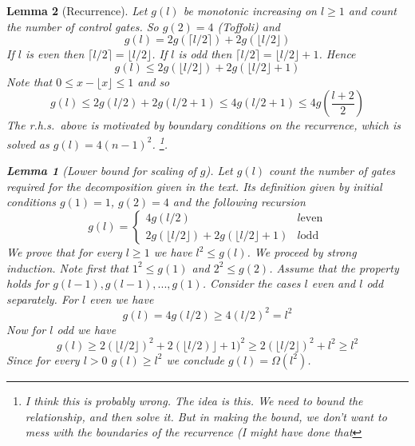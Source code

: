\documentclass[12pt]{article}
\newcommand{\1}[1]{\mathds{1}\left[#1\right]}
\newtheorem{lemma}{Lemma}
\begin{document}
\begin{lemma}[Recurrence]
Let $g(l)$ be monotonic increasing on $l\geq 1$ and count the number of control gates.  So $g(2)=4$ (Toffoli) and 
\begin{equation}
    g(l) = 2 g(\lceil l/2 \rceil) + 2 g(\lfloor l/2 \rfloor)
\end{equation}
If $l$ is even then $\lceil l/2 \rceil = \lfloor l/2 \rfloor$.  If $l$ is odd then $\lceil l/2 \rceil = \lfloor l/2 \rfloor + 1$.  Hence 
\begin{equation}
    g(l) \leq 2 g(\lfloor l/2 \rfloor) + 2g(\lfloor l/2 \rfloor + 1)
\end{equation}
Note that $0 \leq x-\lfloor x \rfloor\leq 1$ and so 
\begin{equation}
    g(l) \leq 2 g(l/2) + 2g(l/2 + 1)\leq 4 g(l/2 + 1)\leq  4 g\left(\frac{l+2}{2}\right)
\end{equation}
The r.h.s.~above is motivated by boundary conditions on the recurrence, which is solved as $g(l)=4(n-1)^2$. \footnote{I think this is probably wrong.  The idea is this.  We need to bound the relationship, and then solve it.  But in making the bound, we don't want to mess with the boundaries of the recurrence (I might have done that}.  

\begin{lemma}[Lower bound for scaling of $g$]
Let $g(l)$ count the number of gates required for the decomposition given in the text. Its definition given by initial conditions $g(1)=1$, $g(2)=4$ and the following recursion
$$g(l)=\begin{cases}4g(l/2)&l \text{even}\\ 2g(\lfloor l/2 \rfloor) + 2g(\lfloor l/2 \rfloor +1)&l \text{odd}\end{cases}$$
We prove that for every  $l \geq 1$ we have  $l^2 \leq g(l)$. We proceed by strong induction. Note first that $1^2 \leq g(1)$ and $2^2 \leq g(2)$. Assume that the property holds for $g(l-1), g(l-1), ..., g(1)$. Consider the cases $l$ even and $l$ odd separately.
For $l$ even we have 
\begin{equation}
    g(l)= 4g(l/2) \geq 4 (l/2)^2 = l^2
\end{equation}
Now for $l$ odd we have
\begin{equation}
    g(l) \geq 2 (\lfloor l/2 \rfloor)^2 + 2 (\lfloor l/2)\rfloor +1)^2 \geq 2 (\lfloor l/2 \rfloor)^2 + l^2 \geq l^2
\end{equation}
Since for every $l>0$ $g(l) \geq l^2$ we conclude $g(l)=\Omega (l^2)$.
\end{lemma}





\end{lemma}
\end{document}
